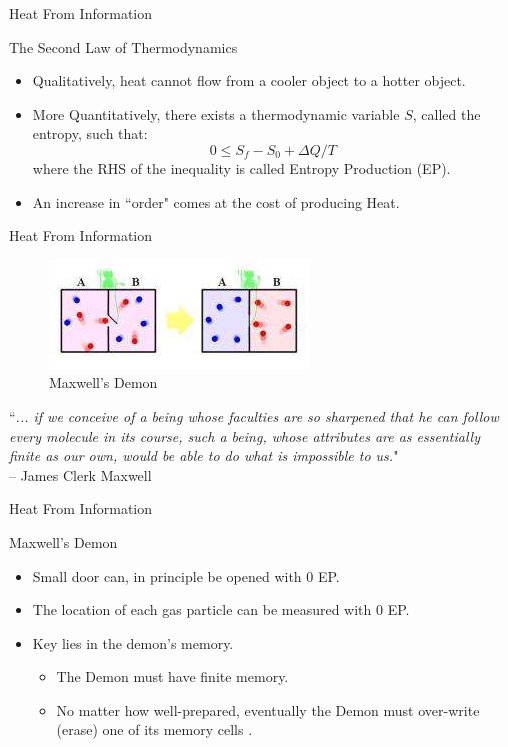 

\begin{frame}{Heat From Information}
\begin{block}{The Second Law of Thermodynamics}
	\begin{itemize}
	\item Qualitatively, heat cannot flow from a cooler object to a hotter object.
	\item More Quantitatively, there exists a thermodynamic variable $S$, called the entropy, such that:
	\begin{equation*}
	0 \le S_f - S_0 + \Delta Q /T
	\end{equation*}	
	where the RHS of the inequality is called Entropy Production (EP).
	\item An increase in ``order" comes at the cost of producing Heat.
	\end{itemize}
\end{block}
\end{frame}


\begin{frame}{Heat From Information}
\begin{figure}
	\centering
	\includegraphics[scale=1]{../Images/maxwellsdemon.jpg}
	\caption{Maxwell's Demon}
	\label{fig:MaxwellsDemon}
\end{figure}
``\textit{... if we conceive of a being whose faculties are so sharpened that he can follow every molecule in its course, such a being, whose attributes are as essentially finite as our own, would be able to do what is impossible to us.}"\\
 \hspace{10mm} -- James Clerk Maxwell
\end{frame}

\begin{frame}{Heat From Information}
\begin{block}{Maxwell's Demon}
\begin{itemize}
	\item Small door can, in principle be opened with 0 EP.
	\item The location of each gas particle can be measured with 0 EP.
	\item Key lies in the demon's memory.
	\begin{itemize}
	\item The Demon must have finite memory.
	\item No matter how well-prepared, eventually the Demon must over-write (erase) one of its memory cells \parencite{bennett_thermodynamics_1982}.
	\end{itemize}
\end{itemize}
\end{block}
\end{frame}

